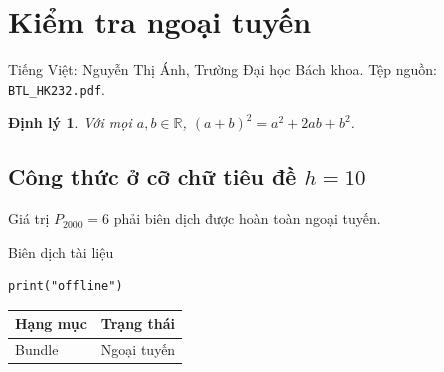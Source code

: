 \documentclass[a4paper]{article}
\newtheorem{theorem}{Định lý}
\begin{document}
\section{Kiểm tra ngoại tuyến}
Tiếng Việt: Nguyễn Thị Ánh, Trường Đại học Bách khoa.
Tệp nguồn: \texttt{BTL\_HK232.pdf}.

\begin{theorem}
Với mọi $a,b \in \mathbb{R}$, $(a+b)^2=a^2+2ab+b^2$.
\end{theorem}

\subsection{Công thức ở cỡ chữ tiêu đề $h=10$}
Giá trị $P_{2000}=6$ phải biên dịch được hoàn toàn ngoại tuyến.

\begin{algorithm}[H]
Biên dịch tài liệu\;
\end{algorithm}

\begin{lstlisting}
print("offline")
\end{lstlisting}


\begin{tabular}{ll}
\toprule
Hạng mục & Trạng thái \\
\midrule
Bundle & Ngoại tuyến \\
\bottomrule
\end{tabular}
\end{document}
